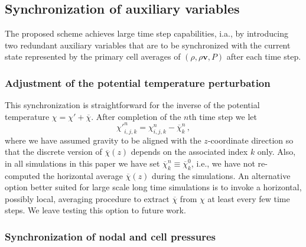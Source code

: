 \documentclass{ametsoc}
\theoremstyle{definition}
\newcommand{\vect}[1]{{\mathbf{#1}}}
\newcommand{\vv}{\vect{v}}
\newcommand{\chibar}{\overline{\chi}}
\newcommand{\chiprime}{{\chi'}}
\begin{document}

\subsection{Synchronization of auxiliary variables}
\label{ssec:Synchronization}

The proposed scheme achieves large time step capabilities, i.a., by introducing
two redundant auxiliary variables that are to be synchronized with the current
state represented by the primary cell averages of $(\rho, \rho\vv, P)$ after 
each time step. 


\subsubsection{Adjustment of the potential temperature perturbation}
\label{ssec:SynchronizationChi}

This synchronization is straightforward for the inverse of the potential temperature 
$\chi = \chiprime + \chibar$. After completion of the $n$th time step we let
%
\begin{equation}
\chiprime_{i,j,k}^{n} = \chi_{i,j,k}^{n} - \chibar_{k}^{n}\,,
\end{equation}   
%
where we have assumed gravity to be aligned with the $z$-coordinate
direction so that the discrete version of $\chibar(z)$ depends on the 
associated index $k$ only. Also, in all simulations in this paper we have 
set $\chibar_k^{n} \equiv \chibar_k^{0}$, i.e., we have not re-computed
the horizontal average $\chibar(z)$ during the simulations.
An alternative option better suited for large scale long time simulations 
is to invoke a horizontal, possibly local, averaging procedure to extract 
$\chibar$ from $\chi$ at least every few time steps. We leave testing 
this option to future work.	 


\subsubsection{Synchronization of nodal and cell pressures}
\label{ssec:SynchronizationChi}
\end{document}

